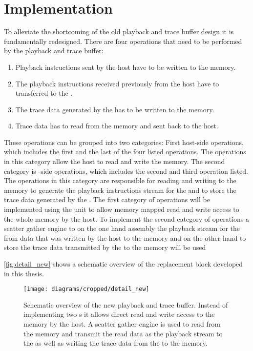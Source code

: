 \section{Implementation}\label{sec:impl}
To alleviate the shortcoming of the old playback and trace buffer design it is fundamentally redesigned.
There are four operations that need to be performed by the playback and trace buffer:
\begin{enumerate}
  \item Playback instructions sent by the host have to be written to the \DDR{} memory.
  \item The playback instructions received previously from the host have to transferred to the \pbexec{}.
  \item The trace data generated by the \pbexec{} has to be written to the \DDR{} memory.
  \item Trace data has to read from the \DDR{} memory and sent back to the host.
\end{enumerate}
These operations can be grouped into two categories: First host-side operations, which includes the first and the last of the four listed operations. The operations in this category allow the host to read and write the \DDR{} memory.
The second category is \FPGA{}-side operations, which includes the second and third operation listed. The operations in this category are responsible for reading and writing to the \DDR{} memory to generate the playback instructions stream for the \pbexec{} and to store the trace data generated by the \pbexec{}.
The first category of operations will be implemented using the \FAXI{} unit to allow memory mapped read and write access to the whole \DDR{} memory by the host.
To implement the second category of operations a scatter gather \DMA{} engine to on the one hand assembly the playback stream for the \pbexec{} from data that was written by the host to the \DDR{} memory and on the other hand to store the trace data transmitted by the \pbexec{} to the \DDR{} memory will be used

\autoref{fig:detail_new} shows a schematic overview of the replacement block developed in this thesis.

\begin{figure}[htbp]
\centerline{\texttt{[image: diagrams/cropped/detail\_new]}}
\caption{Schematic overview of the new playback and trace buffer. Instead of implementing two \FIFO{}s it allows direct read and write access to the \DDR{} memory by the host. A scatter gather \DMA{} engine is used to read from the \DDR{} memory and transmit the read data as the playback stream to the \pbexec{} as well as writing the trace data from the \pbexec{} to the \DDR{} memory.}\label{fig:detail_new}
\end{figure}

